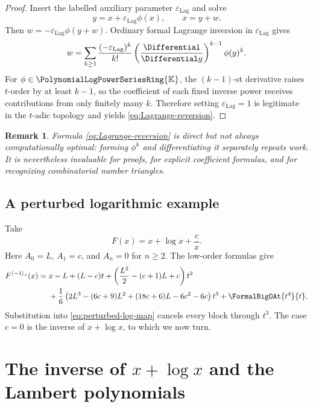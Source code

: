 \documentclass[11pt]{article}
\theoremstyle{pltheorem}
\newtheorem{remark}[theorem]{Remark}
\newcommand{\K}{\mathbb K}
\newcommand{\PL}{\PolynomialLogPowerSeriesRing{\K}}
\newcommand{\rev}{\langle-1\rangle_{\circ}}
\newcommand{\LagrangeAuxiliaryParameter}{\varepsilon_{\mathrm{Lag}}}
\begin{document}
\begin{proof}
Insert the labelled auxiliary parameter \(\LagrangeAuxiliaryParameter\) and solve
\[
 y=x+\LagrangeAuxiliaryParameter\phi(x),
 \qquad x=y+w.
\]
Then \(w=-\LagrangeAuxiliaryParameter\phi(y+w)\).  Ordinary formal Lagrange inversion in \(\LagrangeAuxiliaryParameter\) gives
\[
 w=\sum_{k\ge1}\frac{(-\LagrangeAuxiliaryParameter)^k}{k!}
 \left(\frac{\Differential}{\Differential y}\right)^{k-1}\phi(y)^k.
\]
For \(\phi\in\PL\), the \((k-1)\)-st derivative raises \(t\)-order by at least \(k-1\), so the coefficient of each fixed inverse power receives contributions from only finitely many \(k\).  Therefore setting \(\LagrangeAuxiliaryParameter=1\) is legitimate in the \(t\)-adic topology and yields \cref{eq:Lagrange-reversion}.
\end{proof}

\begin{remark}
Formula \cref{eq:Lagrange-reversion} is direct but not always computationally optimal: forming \(\phi^k\) and differentiating it separately repeats work.  It is nevertheless invaluable for proofs, for explicit coefficient formulas, and for recognizing combinatorial number triangles.
\end{remark}

\subsection{A perturbed logarithmic example}

Take
\begin{equation}\label{eq:perturbed-log-map}
 F(x)=x+\log x+\frac{c}{x}.
\end{equation}
Here \(A_0=L\), \(A_1=c\), and \(A_n=0\) for \(n\ge2\).  The low-order formulas give
\begin{align}
 F^{\rev}(x)={}&x-L+(L-c)t
 +\left(\frac{L^2}{2}-(c+1)L+c\right)t^2
 \notag\\
 &+\frac{1}{6}\left(2L^3-(6c+9)L^2+(18c+6)L-6c^2-6c\right)t^3
 +\FormalBigOAt{t^4}{t}.
 \label{eq:perturbed-log-inverse}
\end{align}
Substitution into \cref{eq:perturbed-log-map} cancels every block through \(t^3\).  The case \(c=0\) is the inverse of \(x+\log x\), to which we now turn.

\section{\texorpdfstring{The inverse of \(x+\log x\) and the Lambert polynomials}{The inverse of x + log x and the Lambert polynomials}}
\label{sec:Lambert-polynomials}
\end{document}
